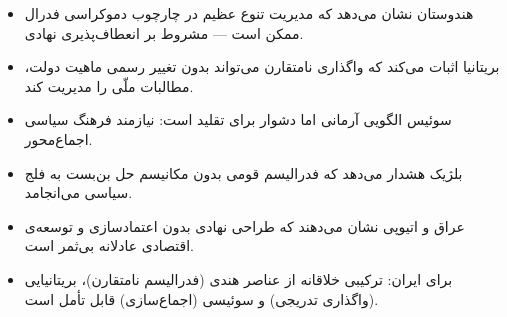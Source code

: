 
\begin{lessonbox}
\begin{itemize}
  \item هندوستان نشان می‌دهد که مدیریت تنوع عظیم در چارچوب دموکراسی فدرال ممکن است — مشروط بر انعطاف‌پذیری نهادی.
  \item بریتانیا اثبات می‌کند که واگذاری نامتقارن می‌تواند بدون تغییر رسمی ماهیت دولت، مطالبات ملّی را مدیریت کند.
  \item سوئیس الگویی آرمانی اما دشوار برای تقلید است: نیازمند فرهنگ سیاسی اجماع‌محور.
  \item بلژیک هشدار می‌دهد که فدرالیسم قومی بدون مکانیسم حل بن‌بست به فلج سیاسی می‌انجامد.
  \item عراق و اتیوپی نشان می‌دهند که طراحی نهادی بدون اعتمادسازی و توسعه‌ی اقتصادی عادلانه بی‌ثمر است.
  \item برای ایران: ترکیبی خلاقانه از عناصر هندی (فدرالیسم نامتقارن)، بریتانیایی (واگذاری تدریجی) و سوئیسی (اجماع‌سازی) قابل تأمل است.
\end{itemize}
\end{lessonbox}